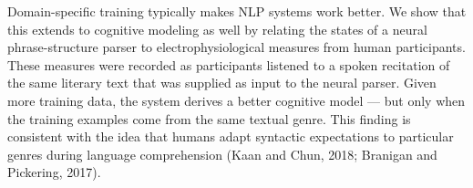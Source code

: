 Domain-specific training typically makes NLP systems work better. We show that this extends to cognitive modeling as well by relating the states of a neural phrase-structure parser to electrophysiological measures from human participants. These measures were recorded as participants listened to a spoken recitation of the same literary text that was supplied as input to the neural parser. Given more training data, the system derives a better cognitive model --- but only when the training examples come from the same textual genre. This finding is consistent with the idea that humans adapt syntactic expectations to particular genres during language comprehension (Kaan and Chun, 2018; Branigan and Pickering, 2017).